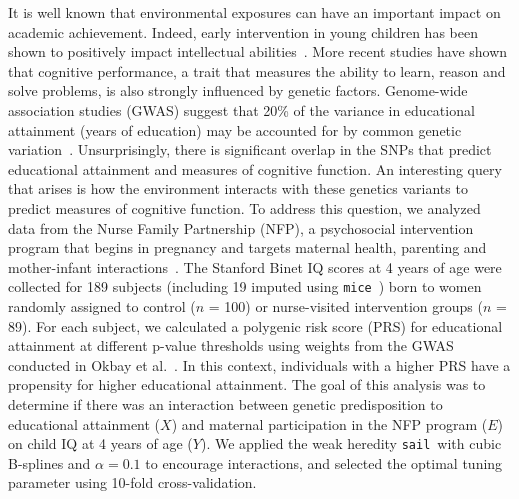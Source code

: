 \documentclass[a4paper,fleqn]{cas-sc}
\newcommand{\sail}{\texttt{sail}}
\begin{document}
It is well known that environmental exposures can have an important impact on academic achievement.
Indeed, early intervention in young children has been shown to positively impact intellectual abilities~\citep{campbell1994effects}. 
More recent studies have shown that cognitive performance, a trait that measures the ability to learn, reason and solve problems, is also strongly influenced by genetic factors. Genome-wide association studies (GWAS) suggest that 20\% of the variance in educational attainment (years of education) may be accounted for by common genetic variation~\citep{rietveld2013gwas,okbay2016genome}. Unsurprisingly, there is significant overlap in the SNPs that predict educational attainment and measures of cognitive function. 
An interesting query that arises is how the environment interacts with these genetics variants to predict measures of cognitive function. 
To address this question, we analyzed data from the Nurse Family Partnership (NFP), a psychosocial intervention program that begins in pregnancy and targets maternal health, parenting and mother-infant interactions~\citep{olds1998long}. 
The Stanford Binet IQ scores at 4 years of age were collected for 189 subjects (including 19 imputed using \texttt{mice}~\citep{buuren2010mice}) born to women randomly assigned to control ($n$ = 100) or nurse-visited intervention groups ($n$ = 89). 
For each subject, we calculated a polygenic risk score (PRS) for educational attainment at different p-value thresholds using weights from the GWAS conducted in Okbay et al.~\citep{okbay2016genome}. 
In this context, individuals with a higher PRS have a propensity for higher educational attainment.  
The goal of this analysis was to determine if there was an interaction between genetic predisposition to educational attainment ($X$) and maternal participation in the NFP program ($E$) on child IQ at 4 years of age ($Y$). 
We applied the weak heredity \sail ~with cubic B-splines and $\alpha=0.1$ to encourage interactions, and selected the optimal tuning parameter using 10-fold cross-validation. 
\end{document}
